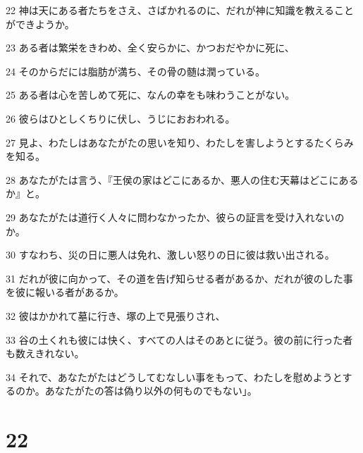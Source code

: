 \par 22 神は天にある者たちをさえ、さばかれるのに、だれが神に知識を教えることができようか。
\par 23 ある者は繁栄をきわめ、全く安らかに、かつおだやかに死に、
\par 24 そのからだには脂肪が満ち、その骨の髄は潤っている。
\par 25 ある者は心を苦しめて死に、なんの幸をも味わうことがない。
\par 26 彼らはひとしくちりに伏し、うじにおおわれる。
\par 27 見よ、わたしはあなたがたの思いを知り、わたしを害しようとするたくらみを知る。
\par 28 あなたがたは言う、『王侯の家はどこにあるか、悪人の住む天幕はどこにあるか』と。
\par 29 あなたがたは道行く人々に問わなかったか、彼らの証言を受け入れないのか。
\par 30 すなわち、災の日に悪人は免れ、激しい怒りの日に彼は救い出される。
\par 31 だれが彼に向かって、その道を告げ知らせる者があるか、だれが彼のした事を彼に報いる者があるか。
\par 32 彼はかかれて墓に行き、塚の上で見張りされ、
\par 33 谷の土くれも彼には快く、すべての人はそのあとに従う。彼の前に行った者も数えきれない。
\par 34 それで、あなたがたはどうしてむなしい事をもって、わたしを慰めようとするのか。あなたがたの答は偽り以外の何ものでもない」。

\chapter{22}


